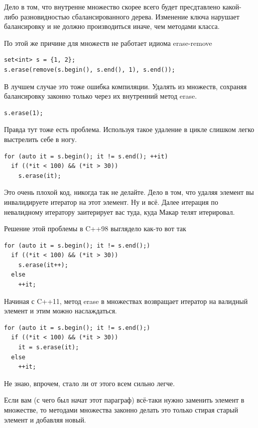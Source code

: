\documentclass[a4paper,12pt,oneside]{book}
\begin{document}
Дело в том, что внутренне множество скорее всего будет пресдтавлено какой-либо разновидностью сбалансированного дерева. Изменение ключа нарушает балансировку и не должно производиться иначе, чем методами класса.

По этой же причине для множеств не работает идиома erase-remove

\begin{lstlisting}
set<int> s = {1, 2};
s.erase(remove(s.begin(), s.end(), 1), s.end());
\end{lstlisting}

В лучшем случае это тоже ошибка компиляции. Удалять из множеств, сохраняя балансировку законно только через их внутренний метод erase.

\begin{lstlisting}
s.erase(1);
\end{lstlisting}

Правда тут тоже есть проблема. Используя такое удаление в цикле слишком легко выстрелить себе в ногу.

\begin{lstlisting}
for (auto it = s.begin(); it != s.end(); ++it)
  if ((*it < 100) && (*it > 30))
    s.erase(it);
\end{lstlisting}

Это очень плохой код, никогда так не делайте. Дело в том, что удаляя элемент вы инвалидируете итератор на этот элемент. Ну и всё. Далее итерация по невалидному итератору заитерирует вас туда, куда Макар телят итерировал.

Решение этой проблемы в C++98 выглядело как-то вот так

\begin{lstlisting}
for (auto it = s.begin(); it != s.end();)
  if ((*it < 100) && (*it > 30))
    s.erase(it++);
  else
    ++it;
\end{lstlisting}

Начиная с C++11, метод erase в множествах возвращает итератор на валидный элемент и этим можно наслаждаться.

\begin{lstlisting}
for (auto it = s.begin(); it != s.end();)
  if ((*it < 100) && (*it > 30))
    it = s.erase(it);
  else
    ++it;
\end{lstlisting}

Не знаю, впрочем, стало ли от этого всем сильно легче.

Если вам (с чего был начат этот параграф) всё-таки нужно заменить элемент в множестве, то методами множества законно делать это только стирая старый элемент и добавляя новый.
\end{document}
